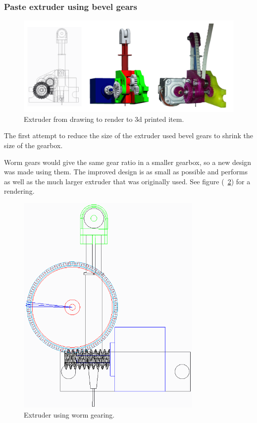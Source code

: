 \subsubsection{Paste extruder using bevel gears}
\begin{figure}[ht!]
\centering
\includegraphics[width=170mm]{resources/extruders.png}
\caption{Extruder from drawing to render to 3d printed item.}
\label{overflow}
\end{figure}

The first attempt to reduce the size of the extruder used bevel gears to shrink the size of the gearbox. 

Worm gears would give the same gear ratio in a smaller gearbox, so a new design was made using them. The improved design is as small as possible and performs as well as the much larger extruder that
was originally used. See figure (~\ref{wormextruder}) for a rendering.

\begin{figure}[ht!]
\centering
\includegraphics[width=90mm]{resources/worm.png}
\caption{Extruder using worm gearing.}
\label{wormextruder}
\end{figure}



